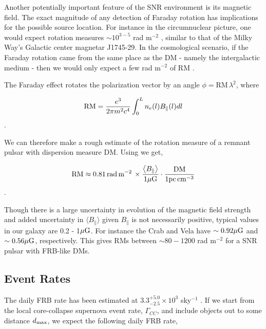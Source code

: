 \documentclass[useAMS,usenatbib]{mn2e}
\begin{document}
Another potentially important feature of the SNR environment is its magnetic
field. 
The exact magnitude of any detection of Faraday rotation has implications for the possible source location. For
instance in the circumnuclear picture, one would expect rotation measures 
$\sim10^{3-5}$ rad m$^{-2}$ \cite{2015arXiv150101341P}, similar to that of the Milky Way's
Galactic center magnetar J1745-29. In the cosmological scenario, if the Faraday 
rotation
came from the same place as the DM - namely the intergalactic medium -
then we would only expect a few rad m$^{-2}$ of RM \citep{2015A&A...575A.118O}. 

The Faraday effect rotates the polarization vector
by an angle $\phi = $RM$\, \lambda^2$, where

\begin{equation}
\textup{RM} = \frac{e^3}{2\pi m^2 c^4} \int_0^{L} n_e(l) B_\parallel (l) dl
\end{equation}.

We can therefore make a rough estimate of the rotation measure of a remnant 
pulsar with dispersion measure DM. Using 
\cite{2014ira..book.....B} we get,

\begin{equation}
\textup{RM} \approx 0.81\,\textup{rad}  \, \textup{m}^{-2} \, \times \frac{\left < B_{\parallel} \right >}
{1 \mu \rm G} \cdot \frac{\textup{DM}}{1 \textup{pc}\,\textup{cm}^{-3}} 
\end{equation}.

Though there is a large uncertainty in evolution of the magnetic field strength and added
uncertainty in $\langle B_{\parallel} \rangle$ given $B_{\parallel}$ is not necessarily positive, 
typical values in our galaxy are 0.2 - 1$\mu \rm G$. For instance the Crab and Vela have 
$ \sim 0.92 \mu \rm G$ and $\sim 0.56 \mu \rm G$, respectively. 
This gives RMs between $\sim 80-1200$
rad m$^{-2}$ for a SNR pulsar with FRB-like DMs.

\subsection{Event Rates}
\label{rates}

The daily FRB rate has been estimated at $3.3^{+5.0}_{-2.5}\times10^3$ sky$^{-1}$ 
\citep{2015arXiv150500834R}. If we start from the local core-collapse supernova
event rate, $\Gamma_{CC}$, and include objects out to some distance $d_{\rm max}$,
we expect the following daily FRB rate, 
\end{document}
